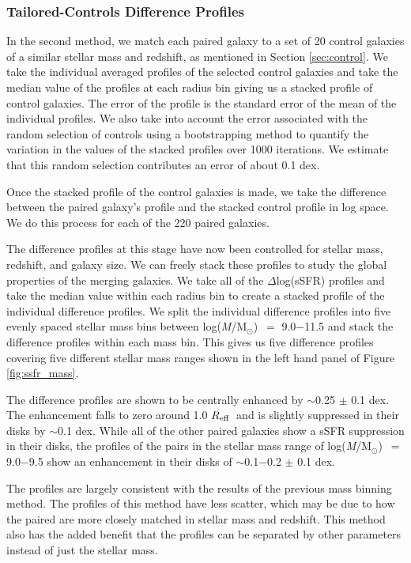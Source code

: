 \documentclass[iop,revtex4,twocolumn,apj,numberedappendix,appendixfloats]{emulateapj}
\newcommand{\reff}{$R_{\rm eff}$}
\newcommand{\logm}{log({\it M}/M$_{\odot}$)}
\begin{document}
\subsubsection{Tailored-Controls Difference Profiles}\label{sec:tailored}

In the second method, we match each paired galaxy to a set of 20 control galaxies of a similar stellar mass and redshift, as mentioned in Section \ref{sec:control}. We take the individual averaged profiles of the selected control galaxies and take the median value of the profiles at each radius bin giving us a stacked profile of control galaxies. The error of the profile is the standard error of the mean of the individual profiles. We also take into account the error associated with the random selection of controls using a bootstrapping method to quantify the variation in the values of the stacked profiles over 1000 iterations. We estimate that this random selection contributes an error of about 0.1 dex.

Once the stacked profile of the control galaxies is made, we take the difference between the paired galaxy's profile and the stacked control profile in log space. We do this process for each of the 220 paired galaxies. 

The difference profiles at this stage have now been controlled for stellar mass, redshift, and galaxy size. We can freely stack these profiles to study the global properties of the merging galaxies. We take all of the $\Delta$log(sSFR) profiles and take the median value within each radius bin to create a stacked profile of the individual difference profiles. We split the individual difference profiles into five evenly spaced stellar mass bins between \logm\ $=$ 9.0$-$11.5 and stack the difference profiles within each mass bin. This gives us five difference profiles covering five different stellar mass ranges shown in the left hand panel of Figure \ref{fig:ssfr_mass}. 

The difference profiles are shown to be centrally enhanced by $\sim$0.25 $\pm$ 0.1 dex. The enhancement falls to zero around 1.0 \reff\ and is slightly suppressed in their disks by $\sim$0.1 dex. While all of the other paired galaxies show a sSFR suppression in their disks, the profiles of the pairs in the stellar mass range of \logm\ $=$ 9.0$-$9.5 show an enhancement in their disks of $\sim$0.1$-$0.2 $\pm$ 0.1 dex. 

The profiles are largely consistent with the results of the previous mass binning method. The profiles of this method have less scatter, which may be due to how the paired are more closely matched in stellar mass and redshift. This method also has the added benefit that the profiles can be separated by other parameters instead of just the stellar mass. 
\end{document}
